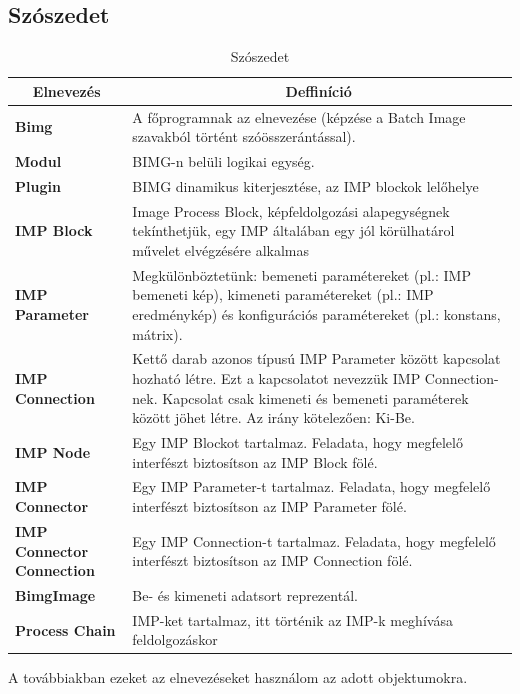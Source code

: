 \documentclass[a4paper,12pt,oneside]{report}
\begin{document}
\begin{table}[h]
\subsection{Szószedet}
\begin{tabular}{p{3cm}|p{10cm}}

\toprule
\multicolumn{1}{c}{\textbf{Elnevezés}} & \multicolumn{1}{c}{\textbf{Deffiníció}} \\ \midrule
\textbf{Bimg} & A főprogramnak az elnevezése (képzése a Batch Image szavakból történt szóösszerántással). \\
\hline
\textbf{Modul} & BIMG-n belüli logikai egység. \\
\hline
\textbf{Plugin} & BIMG dinamikus kiterjesztése, az IMP blockok lelőhelye \\
\hline
\textbf{IMP Block} & Image Process Block, képfeldolgozási alapegységnek tekínthetjük, egy IMP általában egy jól körülhatárol művelet elvégzésére alkalmas \\
\hline
\textbf{IMP Parameter} & Megkülönböztetünk: bemeneti paramétereket (pl.: IMP bemeneti kép), kimeneti paramétereket (pl.: IMP eredménykép) és konfigurációs paramétereket (pl.: konstans, mátrix). \\
\hline
\textbf{IMP Connection} & Kettő darab azonos típusú IMP Parameter között kapcsolat hozható létre. Ezt a kapcsolatot nevezzük IMP Connection-nek. Kapcsolat csak kimeneti és bemeneti paraméterek között jöhet létre. Az irány kötelezően: Ki-Be. \\
\hline
\textbf{IMP Node} & Egy IMP Blockot tartalmaz. Feladata, hogy megfelelő interfészt biztosítson az IMP Block fölé. \\
\hline
\textbf{IMP Connector} & Egy IMP Parameter-t tartalmaz. Feladata, hogy megfelelő interfészt biztosítson az IMP Parameter fölé. \\
\hline
\textbf{IMP Connector Connection} & Egy IMP Connection-t tartalmaz. Feladata, hogy megfelelő interfészt biztosítson az IMP Connection fölé. \\
\hline
\textbf{BimgImage} & Be- és kimeneti adatsort reprezentál. \\
\hline
\textbf{Process Chain} & IMP-ket tartalmaz, itt történik az IMP-k meghívása feldolgozáskor \\

\hline
\end{tabular}
\caption{Szószedet}
\label{table:szoszedet}
\end{table}
 A továbbiakban ezeket az elnevezéseket használom az adott objektumokra.
\end{document}
